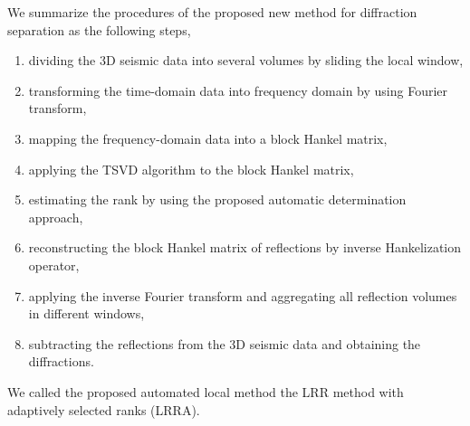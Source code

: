 \documentclass[10pt]{IEEEtran}
\begin{document}
We summarize the procedures of the proposed new method for diffraction separation as the following steps,
\begin{enumerate}
\item dividing the 3D seismic data into several volumes by sliding the local window,
\item transforming the time-domain data into frequency domain by using Fourier transform,
\item mapping the frequency-domain data into a block Hankel matrix,
\item applying the TSVD algorithm to the block Hankel matrix,
\item estimating the rank by using the proposed automatic determination approach,
\item reconstructing the block Hankel matrix of reflections by inverse Hankelization operator,
\item applying the inverse Fourier transform and aggregating all reflection volumes in different windows,
\item subtracting the reflections from the 3D seismic data and obtaining the diffractions. 
\end{enumerate}
We called the proposed automated local method the LRR method with adaptively selected ranks (LRRA). 
\end{document}
